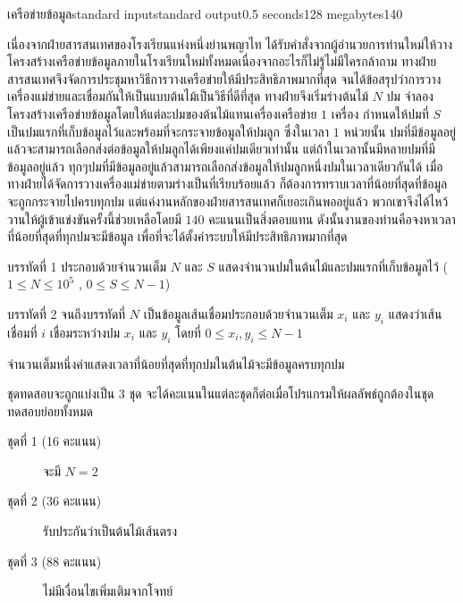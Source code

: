 \documentclass[11pt,a4paper]{article}
\begin{document}
\begin{problem}{เครือข่ายข้อมูล}{standard input}{standard output}{0.5 seconds}{128 megabytes}{140}

เนื่องจากฝ่ายสารสนเทศของโรงเรียนแห่งหนึ่งย่านพญาไท ได้รับคำสั่งจากผู้อำนวยการท่านใหม่ให้วางโครงสร้างเครือข่ายข้อมูลภายในโรงเรียนใหม่ทั้งหมดเนื่องจากอะไรก็ไม่รู้ไม่มีใครกล้าถาม ทางฝ่ายสารสนเทศจึงจัดการประชุมหาวิธีการวางเครือข่ายให้มีประสิทธิภาพมากที่สุด จนได้ข้อสรุปว่าการวางเครื่องแม่ข่ายและเชื่อมกันให้เป็นแบบต้นไม้เป็นวิธีที่ดีที่สุด ทางฝ่ายจึงเริ่มร่างต้นไม้ $N$ ปม จำลองโครงสร้างเครือข่ายข้อมูลโดยให้แต่ละปมของต้นไม้แทนเครื่องเครือข่าย $1$ เครื่อง กำหนดให้ปมที่ $S$ เป็นปมแรกที่เก็บข้อมูลไว้และพร้อมที่จะกระจายข้อมูลให้ปมลูก ซึ่งในเวลา $1$ หน่วยนั้น ปมที่มีข้อมูลอยู่แล้วจะสามารถเลือกส่งต่อข้อมูลให้ปมลูกได้เพียงแค่ปมเดียวเท่านั้น แต่ถ้าในเวลานั้นมีหลายปมที่มีข้อมูลอยู่แล้ว ทุกๆปมที่มีข้อมูลอยู่แล้วสามารถเลือกส่งข้อมูลให้ปมลูกหนึ่งปมในเวลาเดียวกันได้ เมื่อทางฝ่ายได้จัดการวางเครื่องแม่ข่ายตามร่างเป็นที่เรียบร้อยแล้ว ก็ต้องการทราบเวลาที่น้อยที่สุดที่ข้อมูลจะถูกกระจายไปครบทุกปม แต่แค่งานหลักของฝ่ายสารสนเทศก็เยอะเกินพออยู่แล้ว พวกเขาจึงได้ไหว้วานให้ผู้เข้าแข่งขันครั้งนี้ช่วยเหลือโดยมี $140$ คะแนนเป็นสิ่งตอบแทน ดังนั้นงานของท่านคือจงหาเวลาที่น้อยที่สุดที่ทุกปมจะมีข้อมูล เพื่อที่จะได้ตั้งค่าระบบให้มีประสิทธิภาพมากที่สุด 

\InputFile
บรรทัดที่ 1 ประกอบด้วยจำนวนเต็ม $N$ และ $S$ แสดงจำนวนปมในต้นไม้และปมแรกที่เก็บข้อมูลไว้ ($1 \le N \le 10^5$ , $0 \le S \le N-1$)

บรรทัดที่ 2 จนถึงบรรทัดที่ $N$ เป็นข้อมูลเส้นเชื่อมประกอบด้วยจำนวนเต็ม $x_i$ และ $y_i$ แสดงว่าเส้นเชื่อมที่ $i$ เชื่อมระหว่างปม $x_i$ และ $y_i$ โดยที่ $0 \le x_i , y_i \le N-1$

\OutputFile
จำนวนเต็มหนึ่งค่าแสดงเวลาที่น้อยที่สุดที่ทุกปมในต้นไม้จะมีข้อมูลครบทุกปม

\Scoring
ชุดทดสอบจะถูกแบ่งเป็น 3 ชุด จะได้คะแนนในแต่ละชุดก็ต่อเมื่อโปรแกรมให้ผลลัพธ์ถูกต้องในชุดทดสอบย่อยทั้งหมด

\begin{description}

\item[ชุดที่ 1 (16 คะแนน)] จะมี $N=2$

\item[ชุดที่ 2 (36 คะแนน)] รับประกันว่าเป็นต้นไม้เส้นตรง

\item[ชุดที่ 3 (88 คะแนน)] ไม่มีเงื่อนไขเพิ่มเติมจากโจทย์

\end{description}


\Examples

\begin{example}
%
%
\end{example}

\end{problem}
\end{document}
